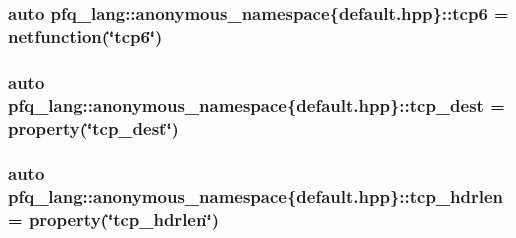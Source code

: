 \hypertarget{namespacepfq__lang_1_1anonymous__namespace_02default_8hpp_03_a734af11014e5ccaef77d6fa39cea0d6b}{
\subsubsection[{tcp6}]{\setlength{\rightskip}{0pt plus 5cm}auto pfq\+\_\+lang\+::anonymous\+\_\+namespace\{default.\+hpp\}\+::tcp6 = {\bf netfunction}(\char`\"{}tcp6\char`\"{})}}\label{namespacepfq__lang_1_1anonymous__namespace_02default_8hpp_03_a734af11014e5ccaef77d6fa39cea0d6b}
\hypertarget{namespacepfq__lang_1_1anonymous__namespace_02default_8hpp_03_a3123415d88452c599055bf8eaba2211e}{
\subsubsection[{tcp\+\_\+dest}]{\setlength{\rightskip}{0pt plus 5cm}auto pfq\+\_\+lang\+::anonymous\+\_\+namespace\{default.\+hpp\}\+::tcp\+\_\+dest = {\bf property}(\char`\"{}tcp\+\_\+dest\char`\"{})}}\label{namespacepfq__lang_1_1anonymous__namespace_02default_8hpp_03_a3123415d88452c599055bf8eaba2211e}
\hypertarget{namespacepfq__lang_1_1anonymous__namespace_02default_8hpp_03_aa8e6b2154ad12220fd1f348c37eaa621}{
\subsubsection[{tcp\+\_\+hdrlen}]{\setlength{\rightskip}{0pt plus 5cm}auto pfq\+\_\+lang\+::anonymous\+\_\+namespace\{default.\+hpp\}\+::tcp\+\_\+hdrlen = {\bf property}(\char`\"{}tcp\+\_\+hdrlen\char`\"{})}}\label{namespacepfq__lang_1_1anonymous__namespace_02default_8hpp_03_aa8e6b2154ad12220fd1f348c37eaa621}
